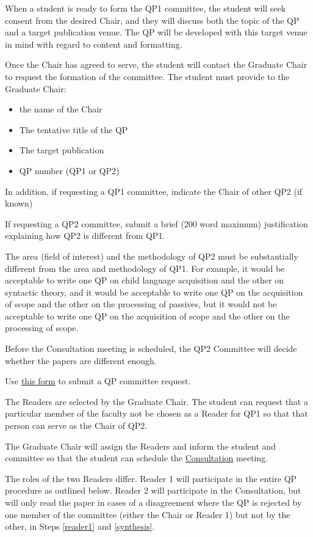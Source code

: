 \documentclass[
]{book}
\providecommand{\tightlist}{%
  \setlength{\itemsep}{0pt}\setlength{\parskip}{0pt}}
\begin{document}
When a student is ready to form the QP1 committee, the student will seek consent from the desired Chair, and they will discuss both the topic of the QP and a target publication venue. The QP will be developed with this target venue in mind with regard to content and formatting.

Once the Chair has agreed to serve, the student will contact the Graduate Chair to request the formation of the committee. The student must provide to the Graduate Chair:

\begin{itemize}
\tightlist
\item
  the name of the Chair
\item
  The tentative title of the QP
\item
  The target publication
\item
  QP number (QP1 or QP2)
\end{itemize}

In addition, if requesting a QP1 committee, indicate the Chair of other QP2 (if known)

If requesting a QP2 committee, submit a brief (200 word maximum) justification explaining how QP2 is different from QP1.

The area (field of interest) and the methodology of QP2 must be substantially different from the area and methodology of QP1. For example, it would be acceptable to write one QP on child language acquisition and the other on syntactic theory, and it would be acceptable to write one QP on the acquisition of scope and the other on the processing of passives, but it would not be acceptable to write one QP on the acquisition of scope and the other on the processing of scope.

Before the Consultation meeting is scheduled, the QP2 Committee will decide whether the papers are different enough.

Use \href{https://forms.gle/YNipJTdAiRSxnrHU8}{this form} to submit a QP committee request.

The Readers are selected by the Graduate Chair. The student can request that a particular member of the faculty not be chosen as a Reader for QP1 so that that person can serve as the Chair of QP2.

The Graduate Chair will assign the Readers and inform the student and committee so that the student can schedule the \protect\hyperlink{consultation}{Consultation} meeting.

The roles of the two Readers differ. Reader 1 will participate in the entire QP procedure as outlined below. Reader 2 will participate in the Consultation, but will only read the paper in cases of a disagreement where the QP is rejected by one member of the committee (either the Chair or Reader 1) but not by the other, in Steps \ref{reader1} and \ref{synthesis}.
\end{document}
